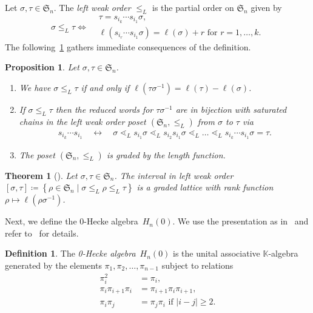 \documentclass[10pt]{amsart}
\newtheorem{thm}{Theorem}[section]
\theoremstyle{plain}
\theoremstyle{plain}
\theoremstyle{plain}
\theoremstyle{plain}
\newtheorem{prop}[prop]{Proposition}
\theoremstyle{plain}
\theoremstyle{definition}
\newtheorem{defi}[defi]{Definition}
\theoremstyle{definition}
\newcommand{\K}{\mathbb K}
\newcommand{\fS}{\mathfrak{S}}
\newcommand{\fs}{s}
\newcommand{\He}{H_n(0)}
\begin{document}
Let $\sigma,\tau \in \fS_n$. The \emph{left weak order} $\leq_L$ is the partial order on $\fS_n$ given by
\begin{equation*}
\sigma \leq_L \tau \iff 
\begin{aligned}
&\tau = \fs_{i_k} \cdots \fs_{i_1} \sigma, \\
&\ell(\fs_{i_r} \cdots \fs_{i_1} \sigma) = \ell(\sigma) + r \text{ for } r=1,\dots ,k.
\end{aligned}
\end{equation*}
The following~\cref{thm:properties_bruhat_order} gathers immediate consequences of the definition.

\begin{prop} 
		\label{thm:properties_bruhat_order}
	Let $\sigma,\tau \in \fS_n$.
	\begin{enumerate}
		\item We have $\sigma \leq_L \tau$ if and only if $\ell(\tau\sigma^{-1}) = \ell(\tau) - \ell(\sigma)$.
		\item If $\sigma\leq_L \tau$ then the reduced words for $\tau\sigma^{-1}$ are in bijection with saturated chains in the left weak order poset $(\fS_n, \leq_L)$ from $\sigma$ to $\tau$ via 
		\begin{align*}
		\fs_{i_k} \cdots \fs_{i_1} \quad \longleftrightarrow \quad \sigma \lessdot_L \fs_{i_1} \sigma \lessdot_L \fs_{i_2}\fs_{i_1} \sigma \lessdot_L\dots \lessdot_L \fs_{i_k} \cdots \fs_{i_1}\sigma = \tau.
		\end{align*}
		\item The poset $(\fS_n, \leq_L)$ is graded by the length function.
	\end{enumerate}
\end{prop}

\begin{thm}[{\cite[Corollary~3.2.2]{Bjorner2006}}]
	\label{thm:bruhat_interval}
	Let $\sigma,\tau\in \fS_n$. The interval in left weak order $[\sigma, \tau] \coloneqq \left\{\rho \in \fS_n \mid \sigma \leq_L \rho \leq_L \tau \right\}$ is a graded lattice with rank function $\rho \mapsto \ell(\rho \sigma^{-1})$.
\end{thm}
 
Next, we define the 0-Hecke algebra~$\He$. We use the presentation as in~\cite{Tewari2015} and refer to~\cite[Ch.~1]{Mathas1999} for details.

\begin{defi}
	\label{thm:0-Hecke algebra}
	The \emph{0-Hecke algebra}~$\He$ is the unital associative $\K$-algebra generated by the elements $\pi_1,\pi_2,\dots ,\pi_{n-1}$ subject to relations
	\begin{align*}
	\pi_i^2 &= \pi_i, \\
	\pi_i\pi_{i+1}\pi_i &= \pi_{i+1} \pi_{i} \pi_{i+1}, \\
	\pi_i \pi_j &= \pi_j \pi_i \text{ if } |i-j| \geq 2. 	 
	\end{align*}
\end{defi}
\end{document}
